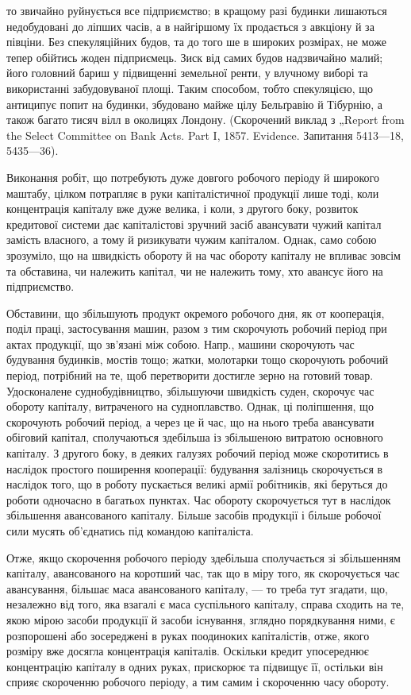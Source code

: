 \parcont{}  %
то звичайно руйнується все підприємство; в кращому разі будинки
лишаються недобудовані до ліпших часів, а в найгіршому їх продається
з авкціону й за півціни. Без спекуляційних будов, та до того ше в широких
розмірах, не може тепер обійтись жоден підприємець. Зиск від
самих будов надзвичайно малий; його головний бариш у підвищенні
земельної ренти, у влучному виборі та використанні забудовуваної площі.
Таким способом, тобто спекуляцією, що антиципує попит на будинки,
збудовано майже цілу Бельґравію й Тібурнію, а також багато тисяч вілл
в околицях Лондону. (Скорочений виклад з „Report from the Select
Committee on Bank Acts. Part I, 1857. Evidence. Запитання 5413—18,
5435—36).

Виконання робіт, що потребують дуже довгого робочого періоду й
широкого маштабу, цілком потрапляє в руки капіталістичної
продукції лише тоді, коли концентрація капіталу вже дуже велика, і
коли, з другого боку, розвиток кредитової системи дає капіталістові зручний
засіб авансувати чужий капітал замість власного, а тому й ризикувати
чужим капіталом. Однак, само собою зрозуміло, що на швидкість обороту
й на час обороту капіталу не впливає зовсім та обставина, чи належить
капітал, чи не належить тому, хто авансує його на підприємство.

Обставини, що збільшують продукт окремого робочого дня, як от кооперація,
поділ праці, застосування машин, разом з тим скорочують робочий
період при актах продукції, що зв’язані між собою. Напр., машини
скорочують час будування будинків, мостів тощо; жатки, молотарки
тощо скорочують робочий період, потрібний на те, щоб перетворити
достигле зерно на готовий товар. Удосконалене суднобудівництво, збільшуючи
швидкість суден, скорочує час обороту капіталу, витраченого на
судноплавство. Однак, ці поліпшення, що скорочують робочий період, а
через це й час, що на нього треба авансувати обіговий капітал, сполучаються
здебільша із збільшеною витратою основного капіталу. З другого
боку, в деяких галузях робочий період може скоротитись в наслідок
простого поширення кооперації: будування залізниць скорочується
в наслідок того, що в роботу пускається великі армії робітників, які
беруться до роботи одночасно в багатьох пунктах. Час обороту скорочується
тут в наслідок збільшення авансованого капіталу. Більше засобів
продукції і більше робочої сили мусять об’єднатись під командою
капіталіста.

Отже, якщо скорочення робочого періоду здебільша сполучається зі
збільшенням капіталу, авансованого на коротший час, так що в міру того,
як скорочується час авансування, більшає маса авансованого капіталу, — то
треба тут згадати, що, незалежно від того, яка взагалі є маса суспільного
капіталу, справа сходить на те, якою мірою засоби продукції й засоби
існування, зглядно порядкування ними, є розпорошені або зосереджені
в руках поодиноких капіталістів, отже, якого розміру вже
досягла концентрація капіталів. Оскільки кредит упосереднює концентрацію
капіталу в одних руках, прискорює та підвищує її, остільки він
сприяє скороченню робочого періоду, а тим самим і скороченню часу обороту.
